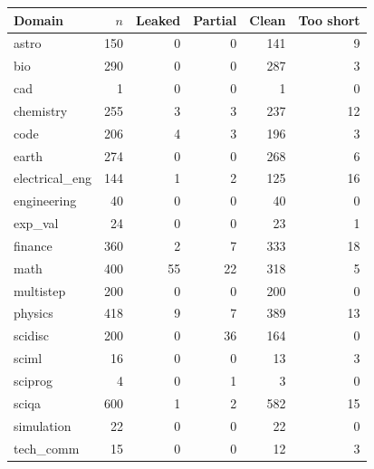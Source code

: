 \begin{tabular}{lrrrrr}
\toprule
Domain & $n$ & Leaked & Partial & Clean & Too short \\
\midrule
astro & 150 & 0 & 0 & 141 & 9 \\
bio & 290 & 0 & 0 & 287 & 3 \\
cad & 1 & 0 & 0 & 1 & 0 \\
chemistry & 255 & 3 & 3 & 237 & 12 \\
code & 206 & 4 & 3 & 196 & 3 \\
earth & 274 & 0 & 0 & 268 & 6 \\
electrical\_eng & 144 & 1 & 2 & 125 & 16 \\
engineering & 40 & 0 & 0 & 40 & 0 \\
exp\_val & 24 & 0 & 0 & 23 & 1 \\
finance & 360 & 2 & 7 & 333 & 18 \\
math & 400 & 55 & 22 & 318 & 5 \\
multistep & 200 & 0 & 0 & 200 & 0 \\
physics & 418 & 9 & 7 & 389 & 13 \\
scidisc & 200 & 0 & 36 & 164 & 0 \\
sciml & 16 & 0 & 0 & 13 & 3 \\
sciprog & 4 & 0 & 1 & 3 & 0 \\
sciqa & 600 & 1 & 2 & 582 & 15 \\
simulation & 22 & 0 & 0 & 22 & 0 \\
tech\_comm & 15 & 0 & 0 & 12 & 3 \\
\bottomrule
\end{tabular}

